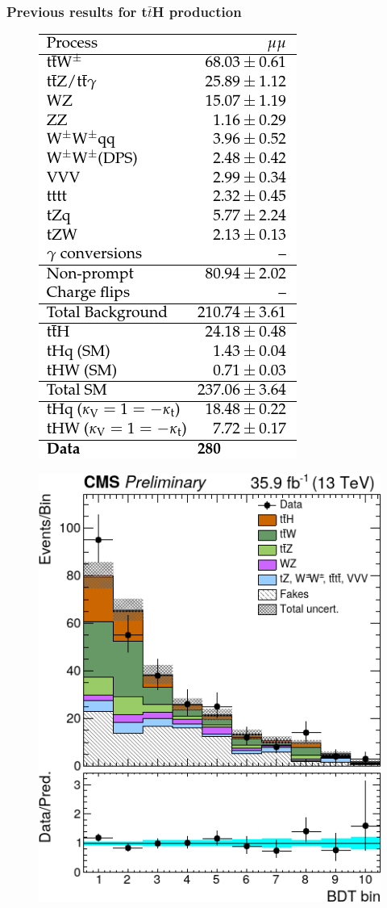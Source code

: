 \documentclass[11pt]{beamer}
\begin{document}
\begin{frame}
\frametitle{Previous results for t$\bar{t}$H production}
\begin{multicols}{2}
\begin{center}
	\begin{figure}
		\includegraphics[scale=0.4]{figures/tth-table.png}
		\caption*{}
	\end{figure}
\end{center}
\columnbreak
\begin{center}
	\begin{figure}
		\includegraphics[scale=0.3]{figures/bdt.png}

\end{figure}
\end{center}
\end{multicols}
\end{frame}
\end{document}
